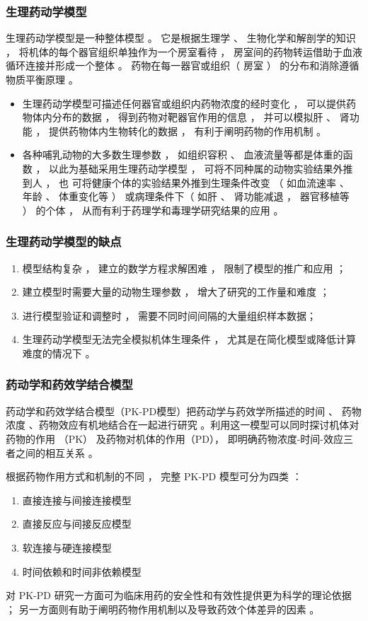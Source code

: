\documentclass[dvipsnames, svgnames, x11names]{beamer}
\begin{document}
\begin{frame}
	\frametitle{生理药动学模型}
	生理药动学模型是一种整体模型 。 它是根据生理学 、 生物化学和解剖学的知识 ， 将机体的每个器官组织单独作为一个房室看待 ， 房室间的药物转运借助于血液循环连接并形成一个整体 。 药物在每一器官或组织（ 房室 ） 的分布和消除遵循物质平衡原理 。 
	\begin{itemize}
	  \item 生理药动学模型可描述任何器官或组织内药物浓度的经时变化 ， 可以提供药物体内分布的数据 ， 得到药物对靶器官作用的信息 ， 并可以模拟肝 、 肾功能 ， 提供药物体内生物转化的数据 ， 有利于阐明药物的作用机制 。
	  \item 各种哺乳动物的大多数生理参数 ， 如组织容积 、 血液流量等都是体重的函数 ， 以此为基础采用生理药动学模型 ， 可将不同种属的动物实验结果外推到人 ， 也
	  可将健康个体的实验结果外推到生理条件改变 （ 如血流速率 、 年龄 、 体重变化等 ） 或病理条件下（ 如肝 、 肾功能减退 ， 器官移植等 ） 的个体 ， 从而有利于药理学和毒理学研究结果的应用 。
	\end{itemize}
	
\end{frame}


\begin{frame}
	\frametitle{生理药动学模型的缺点}
	\begin{enumerate}
	  \item 模型结构复杂 ， 建立的数学方程求解困难 ， 限制了模型的推广和应用 ；
	  \item 建立模型时需要大量的动物生理参数 ， 增大了研究的工作量和难度 ；
	  \item 进行模型验证和调整时 ， 需要不同时间间隔的大量组织样本数据；
	  \item 生理药动学模型无法完全模拟机体生理条件 ， 尤其是在简化模型或降低计算难度的情况下 。
	\end{enumerate}
\end{frame}


\begin{frame}
	\frametitle{药动学和药效学结合模型}
	药动学和药效学结合模型（PK-PD模型）把药动学与药效学所描述的时间 、 药物浓度 、药物效应有机地结合在一起进行研究 。利用这一模型可以同时探讨机体对药物的作用 （PK） 及药物对机体的作用（PD）， 即明确药物浓度-时间-效应三者之间的相互关系 。
	
	根据药物作用方式和机制的不同 ， 完整 PK-PD 模型可分为四类 ：
	\begin{enumerate}
	  \item 直接连接与间接连接模型
	  \item 直接反应与间接反应模型
	  \item 软连接与硬连接模型
	  \item 时间依赖和时间非依赖模型
	\end{enumerate}
	对 PK-PD 研究一方面可为临床用药的安全性和有效性提供更为科学的理论依据 ； 另一方面则有助于阐明药物作用机制以及导致药效个体差异的因素 。
\end{frame}
\end{document}
